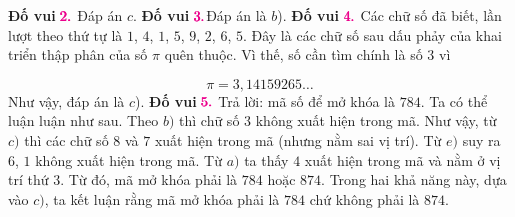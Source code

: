 \textbf{\color{toancuabi}Đố vui} $\color{toancuabi}\pmb{2.}$ Đáp án $c$.
\vskip 0.1cm
\textbf{\color{toancuabi}Đố vui} $\color{toancuabi}\pmb{3.}$Đáp án là $b$).
\vskip 0.1cm
\textbf{\color{toancuabi}Đố vui} $\color{toancuabi}\pmb{4.}$ Các chữ số đã biết, lần lượt theo thứ tự là $1$, $4$, $1$, $5$, $9$, $2$, $6$, $5$. Đây là các chữ số sau dấu phảy của khai triển thập phân của số $\pi$ quên thuộc. Vì thế, số cần tìm chính là số $3$ vì

$$\pi = 3, 14159265\ldots$$
Như vậy, đáp án là $c$).
\vskip 0.1cm
\textbf{\color{toancuabi}Đố vui} $\color{toancuabi}\pmb{5.}$ Trả lời: mã số để mở khóa là $784$.
\vskip 0.1cm
Ta có thể luận luận như sau. Theo $b)$ thì chữ số  $3$  không xuất hiện trong mã. Như vậy, từ $c)$ thì các chữ số  $8$ và $7$ xuất hiện trong mã (nhưng nằm sai vị trí). Từ $e)$ suy ra $6$, $1$ không xuất hiện trong mã. Từ $a)$  ta thấy $4$ xuất hiện trong mã và nằm ở vị trí thứ $3$. Từ đó, mã mở khóa phải là $784$ hoặc $874$. Trong hai khả năng này, dựa vào $c)$, ta kết luận rằng mã mở khóa phải là $784$ chứ không phải là $874$.
\vskip 0.1cm

